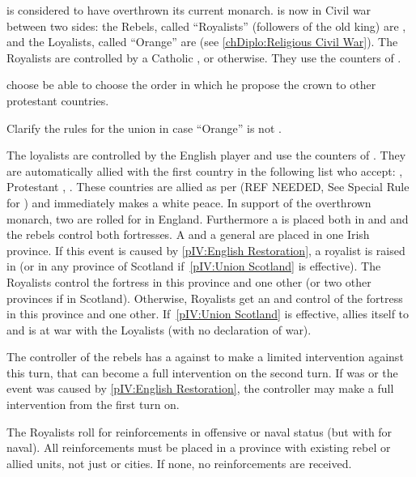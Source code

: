\phevnt
\aparag \ENG is considered to have overthrown its current monarch. \ENG is now
in Civil war between two sides: the Rebels, called ``Royalists'' (followers of
the old king) are \CATHCR , and the Loyalists, called ``Orange'' are \PROTANG
(see \ref{chDiplo:Religious Civil War}).
\bparag The Royalists are controlled by a Catholic \FRA, or \SPA
otherwise. They use the counters of \paysroyalistes.
\begin{todo}
  \ANG choose be able to choose the order in which he propose the crown to
  other protestant countries.

  Clarify the rules for the union in case ``Orange'' is not \HOL.
\end{todo}
\bparag The loyalists are controlled by the English player and use the
counters of \ANG. They are automatically allied with the first country in the
following list who accept: \HOL, Protestant \FRA, \SUE. These countries are
allied as per (REF NEEDED, See Special Rule for \ANG) and immediately makes a
white peace.
\aparag In support of the overthrown monarch, two \REVOLT are rolled for in
England. Furthermore a \REVOLT \faceplus is placed both in \provinceConnacht
and \provinceMumhan and the rebels control both fortresses. A \LD and a
general are placed in one Irish province.
\bparag If this event is caused by \ref{pIV:English Restoration}, a royalist
\ARMY \faceplus is raised in \provinceCymru (or in any province of Scotland
if~\ref{pIV:Union Scotland} is effective). The Royalists control the fortress
in this province and one other (or two other provinces if in
Scotland). Otherwise, Royalists get an \ARMY\facemoins and control of the
fortress in this province and one other.
\aparag If~\ref{pIV:Union Scotland} is effective, \paysEcosse allies itself to
\paysroyalistes and is at war with the Loyalists (with no declaration of
war).

\phdipl
\aparag The controller of the rebels has a \CB against \ENG to make a limited
intervention against \ENG this turn, that can become a full intervention on
the second turn. If \ENG was \CATHCR or the event was caused by
\ref{pIV:English Restoration}, the controller may make a full intervention
from the first turn on.

\phadm
\aparag The Royalists roll for reinforcements in offensive or naval status
(but with  for naval).
\aparag All reinforcements must be placed in a province with existing rebel or
allied units, not just \REVOLT or cities. If none, no reinforcements are
received.

